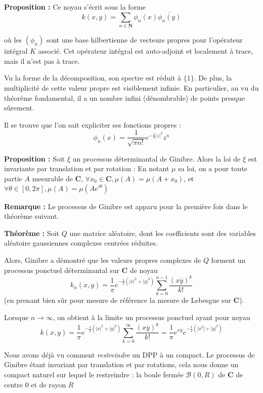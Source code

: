 \documentclass[12pt]{article}
\let\oldsum\sum
\renewcommand{\sum}{\oldsum\limits}
\begin{document}
\textbf{Proposition :} Ce noyau s'écrit sous la forme $$ k(x,y) = \sum_{n \in \mathbf N} \phi_n(x) \overline{\phi_n(y)}$$

où les $(\phi_n)$ sont une base hilbertienne de vecteurs propres pour l'opérateur intégral $K$ associé. Cet opérateur intégral est auto-adjoint et localement à trace, mais il n'est pas à trace.

Vu la forme de la décomposition, son spectre est réduit à $ \{1\} $. De plus, la multiplicité de cette valeur propre est visiblement infinie. En particulier, au vu du théorème fondamental, il a un nombre infini (dénombrable) de points presque sûrement.

Il se trouve que l'on sait expliciter ses fonctions propres : $$ \phi_n(x) = \frac{1}{\sqrt{\pi n!}} e^{- \frac 1 2 |z|^2} z^n $$

\textbf{Proposition :} Soit $ \xi $ un processus déterminantal de Ginibre. Alors la loi de $\xi$ est invariante par translation et par rotation : En notant $\mu$ sa loi, on a pour toute partie $A$ mesurable de $ \mathbf C $, $ \forall x_0 \in \mathbf C, \mu(A) = \mu(A + x_0) $, et $ \forall \theta \in [0,2\pi], \mu(A) = \mu(Ae^{i\theta}) $

\textbf{Remarque :} Le processus de Ginibre est apparu pour la première fois dans le théorème suivant.

\textbf{Théorème :} Soit $Q$ une matrice aléatoire, dont les coefficients sont des variables aléatoire gaussiennes complexes centrées réduites.

Alors, Ginibre \cite{Ginibre1965} a démontré que les valeurs propres complexes de $Q$ forment un processus ponctuel déterminantal sur $\mathbf C$ de noyau $$ k_n(x,y) = \frac 1 \pi e^{-\frac 1 2(|x|^2 + |y|^2)} \sum_{k=0}^{n-1} \frac{(x \overline y)^k}{k!} $$ (en prenant bien sûr pour mesure de référence la mesure de Lebesgue sur $ \mathbf C $).

Lorsque $ n \to \infty $, on obtient à la limite un processus ponctuel ayant pour noyau $$ \displaystyle  k(x,y) = \frac 1 \pi e^{-\frac 1 2(|x|^2 + |y|^2)} \sum_{k=0}^{\infty} \frac{(x \overline y)^k}{k!} = \frac 1 \pi e^{x \overline y} e^{- \frac 1 2 (|x^2| + |y|^2)} $$

Nous avons déjà vu comment \textit{restreindre} un DPP à un compact. Le processus de Ginibre étant invariant par translation et par rotations, cela nous donne un compact naturel sur lequel le restreindre : la boule fermée $ \mathcal B(0,R) $ de $\mathbf C $ de centre $0$ et de rayon $ R $
\end{document}
